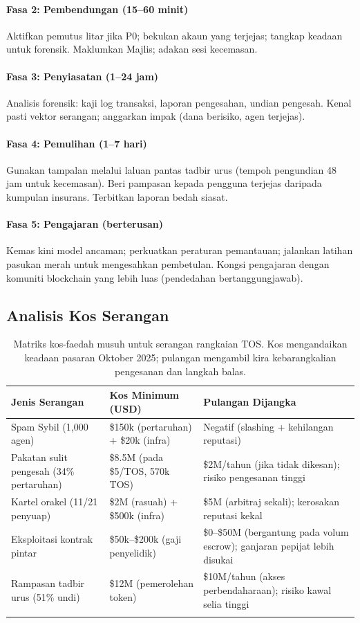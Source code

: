 \documentclass[11pt]{article}
\begin{document}
\paragraph{Fasa 2: Pembendungan (15--60 minit)}
Aktifkan pemutus litar jika P0; bekukan akaun yang terjejas; tangkap keadaan untuk forensik. Maklumkan Majlis; adakan sesi kecemasan.

\paragraph{Fasa 3: Penyiasatan (1--24 jam)}
Analisis forensik: kaji log transaksi, laporan pengesahan, undian pengesah. Kenal pasti vektor serangan; anggarkan impak (dana berisiko, agen terjejas).

\paragraph{Fasa 4: Pemulihan (1--7 hari)}
Gunakan tampalan melalui laluan pantas tadbir urus (tempoh pengundian 48 jam untuk kecemasan). Beri pampasan kepada pengguna terjejas daripada kumpulan insurans. Terbitkan laporan bedah siasat.

\paragraph{Fasa 5: Pengajaran (berterusan)}
Kemas kini model ancaman; perkuatkan peraturan pemantauan; jalankan latihan pasukan merah untuk mengesahkan pembetulan. Kongsi pengajaran dengan komuniti blockchain yang lebih luas (pendedahan bertanggungjawab).

\subsection{Analisis Kos Serangan}

\begin{longtable}{@{}p{}p{}p{}@{}}
\toprule
\textbf{Jenis Serangan} & \textbf{Kos Minimum (USD)} & \textbf{Pulangan Dijangka} \\\midrule
Spam Sybil (1,000 agen) & \$150k (pertaruhan) + \$20k (infra) & Negatif (slashing + kehilangan reputasi) \\
Pakatan sulit pengesah (34\% pertaruhan) & \$8.5M (pada \$5/TOS, 570k TOS) & \$2M/tahun (jika tidak dikesan); risiko pengesanan tinggi \\
Kartel orakel (11/21 penyuap) & \$2M (rasuah) + \$500k (infra) & \$5M (arbitraj sekali); kerosakan reputasi kekal \\
Eksploitasi kontrak pintar & \$50k--\$200k (gaji penyelidik) & \$0--\$50M (bergantung pada volum escrow); ganjaran pepijat lebih disukai \\
Rampasan tadbir urus (51\% undi) & \$12M (pemerolehan token) & \$10M/tahun (akses perbendaharaan); risiko kawal selia tinggi \\
\bottomrule
\caption{Matriks kos-faedah musuh untuk serangan rangkaian TOS. Kos mengandaikan keadaan pasaran Oktober 2025; pulangan mengambil kira kebarangkalian pengesanan dan langkah balas.}
\end{longtable}
\end{document}
